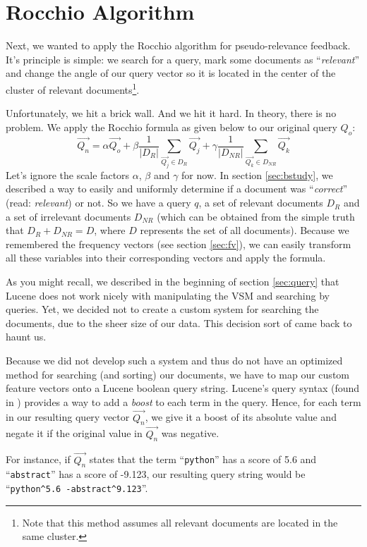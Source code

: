 \documentclass[11pt]{article}
\begin{document}
\section{Rocchio Algorithm}\label{sec:rocchio}
Next, we wanted to apply the \textsf{Rocchio} algorithm for pseudo-relevance feedback. It's principle is simple: we search for a query, mark some documents as ``\textit{relevant}'' and change the angle of our query vector so it is located in the center of the cluster of relevant documents\footnote{Note that this method assumes all relevant documents are located in the same cluster.}.

Unfortunately, we hit a brick wall. And we hit it hard. In theory, there is no problem. We apply the Rocchio formula as given below to our original query $Q_o$:
$$\overrightarrow{Q_n} = \alpha \overrightarrow{Q_o} + \beta \frac{1}{|D_R|} \sum_{\overrightarrow{Q_j} \in D_R}{\overrightarrow{Q_j}} + \gamma \frac{1}{|D_{NR}|} \sum_{\overrightarrow{Q_k} \in D_{NR}}{\overrightarrow{Q_k}}$$
Let's ignore the scale factors $\alpha$, $\beta$ and $\gamma$ for now. In section \ref{sec:bstudy}, we described a way to easily and uniformly determine if a document was ``\textit{correct}'' (read: \textit{relevant}) or not. So we have a query $q$, a set of relevant documents $D_R$ and a set of irrelevant documents $D_{NR}$ (which can be obtained from the simple truth that $D_R + D_{NR} = D$, where $D$ represents the set of all documents). Because we remembered the frequency vectors (see section \ref{sec:fv}), we can easily transform all these variables into their corresponding vectors and apply the formula.

As you might recall, we described in the beginning of section \ref{sec:query} that Lucene does not work nicely with manipulating the VSM and searching by queries. Yet, we decided not to create a custom system for searching the documents, due to the sheer size of our data. This decision sort of came back to haunt us.

Because we did not develop such a system and thus do not have an optimized method for searching (and sorting) our documents, we have to map our custom feature vectors onto a Lucene boolean query string. Lucene's query syntax (found in \cite{lucene}) provides a way to add a \textit{boost} to each term in the query. Hence, for each term in our resulting query vector $\overrightarrow{Q_n}$, we give it a boost of its absolute value and negate it if the original value in $\overrightarrow{Q_n}$ was negative.

For instance, if $\overrightarrow{Q_n}$ states that the term ``\texttt{python}'' has a score of 5.6 and ``\texttt{abstract}'' has a score of -9.123, our resulting query string would be ``\texttt{python\string^5.6 -abstract\string^9.123}''.
\end{document}
